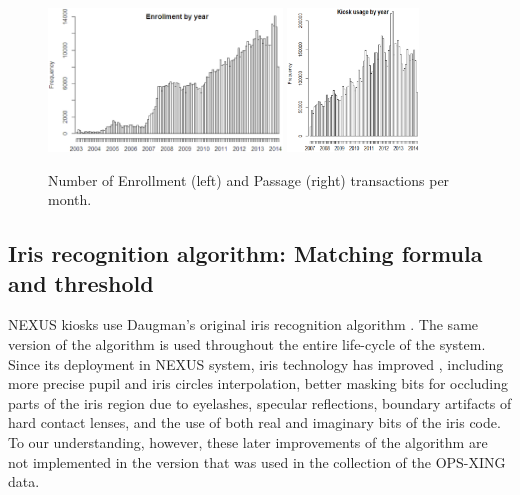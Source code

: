 \documentclass{cta-author}%
\begin{document}
\begin{figure}[!b]
\centering
\includegraphics[height=1.5in, width=0.45\linewidth]{eps/en-by-year0.eps} \quad \quad \quad 
\includegraphics[height=1.5in, width=0.3\linewidth]{eps/pa-by-year0.eps} 

\caption{Number of  Enrollment  (left) and Passage (right) transactions    per month. %
}
\label{ftransactions}
\end{figure}




\subsection{Iris recognition algorithm: %
Matching formula and threshold}
\label{s.NormRule}

NEXUS kiosks 
use  Daugman's original iris recognition algorithm \cite{Daugman2002,Daugman2006}. The same version of the algorithm %
is used throughout the entire life-cycle of the system. 
Since its deployment in NEXUS system, iris technology has improved \cite{Daugman2007,Daugman2015}, including
more precise pupil and iris circles interpolation,  better   masking bits for occluding parts of the iris region due to eyelashes, specular reflections, boundary artifacts of hard contact lenses,
 and the use of both real and imaginary bits of the iris code.
To our understanding, however, these later improvements of the algorithm are not implemented in the version that was used in the collection of the OPS-XING data.
\end{document}
